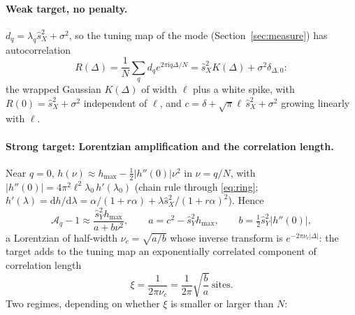 \documentclass[11pt,a4paper]{article}
\newcommand{\sX}{\hat s_X^2}
\newcommand{\sY}{\hat s_Y^2}
\newcommand{\amp}{\mathcal A}
\theoremstyle{remark}
\begin{document}
\paragraph{Weak target, no penalty.} $d_q = \lambda_q\sX + \sigma^2$, so the tuning map of the mode (Section~\ref{sec:measure}) has autocorrelation
\begin{equation}
  R(\Delta) = \frac1N\sum_q d_qe^{2\pi\mathrm iq\Delta/N} = \sX K(\Delta) + \sigma^2\delta_{\Delta,0}:
\end{equation}
the wrapped Gaussian $K(\Delta)$ of width $\ell$ plus a white spike, with $R(0) = \sX + \sigma^2$ independent of $\ell$, and $c = \delta + \sqrt\pi\ell\,\sX + \sigma^2$ growing linearly with $\ell$.

\paragraph{Strong target: Lorentzian amplification and the correlation length.}
Near $q = 0$, $h(\nu)\approx h_{\max} - \tfrac12|h''(0)|\nu^2$ in $\nu = q/N$, with $|h''(0)| = 4\pi^2\ell^2\lambda_0\,h'(\lambda_0)$ (chain rule through \eqref{eq:ring}; $h'(\lambda) = \mathrm dh/\mathrm d\lambda = \alpha/(1+r\alpha) + \lambda\sX/(1+r\alpha)^2$). Hence
\begin{equation}
  \amp_q - 1 \approx \frac{\sY h_{\max}}{a + b\nu^2},\qquad
  a = c^2 - \sY h_{\max},\qquad b = \tfrac12\sY|h''(0)|,
  \label{eq:lorentz}
\end{equation}
a Lorentzian of half-width $\nu_c = \sqrt{a/b}$ whose inverse transform is $e^{-2\pi\nu_c|\Delta|}$: the target adds to the tuning map an exponentially correlated component of correlation length
\begin{equation}
  \xi = \frac1{2\pi\nu_c} = \frac1{2\pi}\sqrt{\frac ba}\ \text{sites}.
\end{equation}
Two regimes, depending on whether $\xi$ is smaller or larger than $N$:
\end{document}
